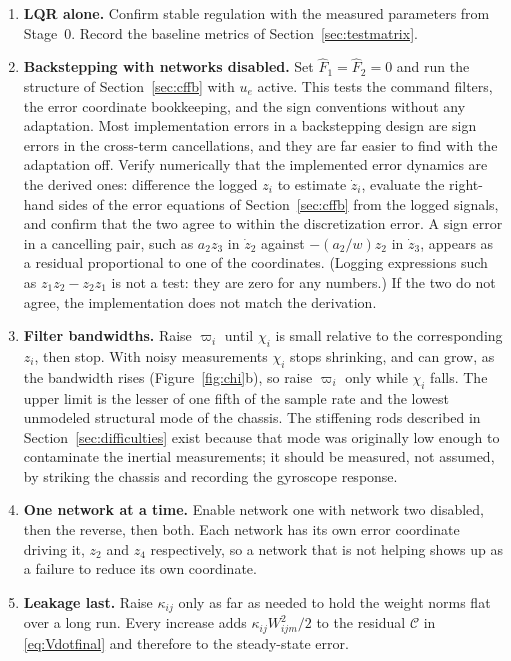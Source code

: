 \begin{enumerate}[label=\arabic*.,leftmargin=*]

\item \textbf{LQR alone.} Confirm stable regulation with the measured
parameters from Stage~0. Record the baseline metrics of
Section~\ref{sec:testmatrix}.

\item \textbf{Backstepping with networks disabled.} Set $\hat F_1=\hat F_2=0$
and run the structure of Section~\ref{sec:cffb} with $u_e$ active. This tests
the command filters, the error coordinate bookkeeping, and the sign conventions
without any adaptation. Most implementation errors in a backstepping design
are sign errors in the cross-term cancellations, and they are far easier to find
with the adaptation off. Verify numerically that the implemented error
dynamics are the derived ones: difference the logged $z_i$ to estimate
$\dot z_i$, evaluate the right-hand sides of the error equations of
Section~\ref{sec:cffb} from the logged signals, and confirm that the two agree
to within the discretization error. A sign error in a cancelling pair, such as
$a_2z_3$ in $\dot z_2$ against $-(a_2/w)z_2$ in $\dot z_3$, appears as a residual
proportional to one of the coordinates. (Logging expressions such as
$z_1z_2-z_2z_1$ is not a test: they are zero for any numbers.) If the two do not
agree, the implementation does not match the derivation.

\item \textbf{Filter bandwidths.} Raise $\varpi_i$ until $\chi_i$ is small
relative to the corresponding $z_i$, then stop. With noisy measurements
$\chi_i$ stops shrinking, and can grow, as the bandwidth rises
(Figure~\ref{fig:chi}b), so raise $\varpi_i$ only while $\chi_i$ falls. The upper limit is the lesser of
one fifth of the sample rate and the lowest unmodeled structural mode of the
chassis. The stiffening rods described in
Section~\ref{sec:difficulties} exist because that mode was originally low enough
to contaminate the inertial measurements; it should be measured, not assumed,
by striking the chassis and recording the gyroscope response.

\item \textbf{One network at a time.} Enable network one with network two
disabled, then the reverse, then both. Each network has its own error
coordinate driving it, $z_2$ and $z_4$ respectively, so a network that is not
helping shows up as a failure to reduce its own coordinate.

\item \textbf{Leakage last.} Raise $\kappa_{ij}$ only as far as needed to hold
the weight norms flat over a long run. Every increase adds
$\kappa_{ij}W_{ijm}^2/2$ to the residual $\mathcal{C}$ in
\eqref{eq:Vdotfinal} and therefore to the steady-state error.

\end{enumerate}


